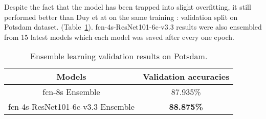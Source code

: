Despite the fact that the model has been trapped into slight overfitting, it
still performed better than Duy et at \cite{duytv-2017} on the same training :
validation split on Potsdam dataset.
(Table~\ref{tab:minhnd_vs_duytv_postdam}). \acrshort{fcn}-4s-ResNet101-6c-v3.3
results were also ensembled from 15 latest models which each model was saved
after every one epoch.
\begin{table}[h!]
    \centering
    \begin{tabular}{ | c | c | }
        \hline
        Models & Validation accuracies \\
        \hline
        \acrshort{fcn}-8s Ensemble & 87.935\% \\
        \acrshort{fcn}-4s-ResNet101-6c-v3.3 Ensemble & \textbf{88.875\%} \\
        \hline
    \end{tabular}
    \caption{Ensemble learning validation results on Potsdam.}
    \label{tab:minhnd_vs_duytv_postdam}
\end{table}

